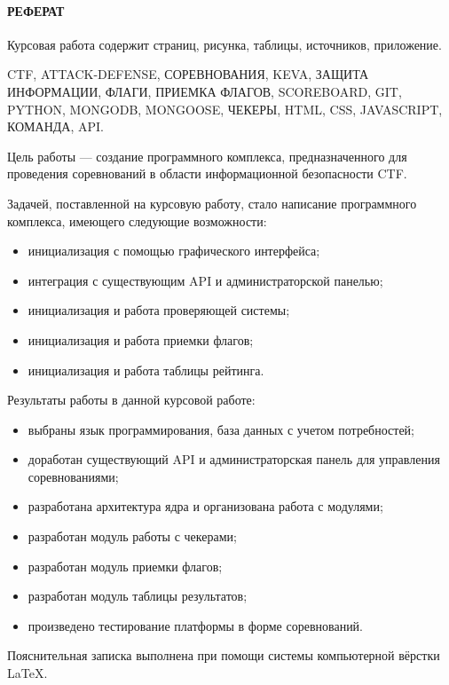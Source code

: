 \newpage
{}
\paragraph{\hfill РЕФЕРАТ \hfill}
Курсовая работа содержит  страниц,  рисунка,  таблицы,  источников,  приложение.

CTF, ATTACK-DEFENSE, СОРЕВНОВАНИЯ, KEVA, ЗАЩИТА ИНФОРМАЦИИ, ФЛАГИ, ПРИЕМКА ФЛАГОВ, SCOREBOARD, GIT, PYTHON, MONGODB, MONGOOSE, ЧЕКЕРЫ, HTML, CSS, JAVASCRIPT, КОМАНДА, API.

Цель работы --- создание программного комплекса, предназначенного для проведения соревнований в области информационной безопасности CTF.

Задачей, поставленной на курсовую работу, стало написание программного комплекса, имеющего следующие возможности: 
\begin{itemize}
\item инициализация с помощью графического интерфейса;
\item интеграция с существующим API и администраторской панелью; 
\item инициализация и работа проверяющей системы;
\item инициализация и работа приемки флагов;
\item инициализация и работа таблицы рейтинга.
\end{itemize}

Результаты работы в данной курсовой работе:

\begin{itemize}
\item выбраны язык программирования, база данных с учетом потребностей;
\item доработан существующий API и администраторская панель для управления соревнованиями; 
\item разработана архитектура ядра и организована работа с модулями;
\item разработан модуль работы с чекерами;
\item разработан модуль приемки флагов;
\item разработан модуль таблицы результатов;
\item произведено тестирование платформы в форме соревнований.
\end{itemize}

Пояснительная записка выполнена при помощи системы компьютерной вёрстки \LaTeX.
